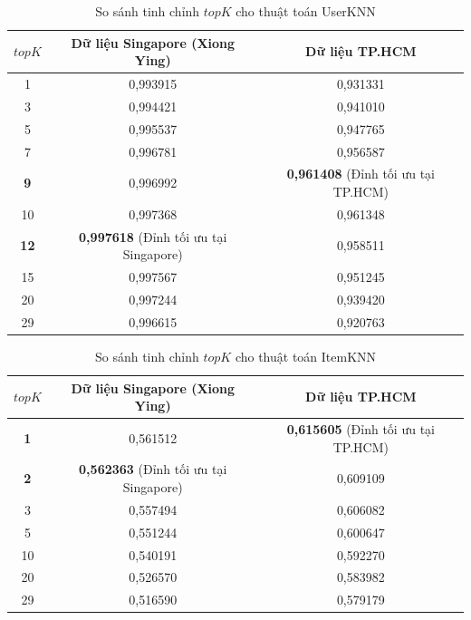 \documentclass[journal,onecolumn,10pt]{IEEEtran}
\begin{document}
\begin{table}[H]
\centering
\caption{So sánh tinh chỉnh $topK$ cho thuật toán UserKNN}
\label{tab:topk_user}
\small
\setlength{\tabcolsep}{8pt}
\begin{tabular}{ccc}
\toprule
$topK$ & Dữ liệu Singapore (Xiong Ying) & Dữ liệu TP.HCM \\
\midrule
1  & 0,993915 & 0,931331 \\
3  & 0,994421 & 0,941010 \\
5  & 0,995537 & 0,947765 \\
7  & 0,996781 & 0,956587 \\
\textbf{9}  & 0,996992 & \textbf{0,961408} (Đỉnh tối ưu tại TP.HCM) \\
10 & 0,997368 & 0,961348 \\
\textbf{12} & \textbf{0,997618} (Đỉnh tối ưu tại Singapore) & 0,958511 \\
15 & 0,997567 & 0,951245 \\
20 & 0,997244 & 0,939420 \\
29 & 0,996615 & 0,920763 \\
\bottomrule
\end{tabular}
\end{table}

\begin{table}[H]
\centering
\caption{So sánh tinh chỉnh $topK$ cho thuật toán ItemKNN}
\label{tab:topk_item}
\small
\setlength{\tabcolsep}{8pt}
\begin{tabular}{ccc}
\toprule
$topK$ & Dữ liệu Singapore (Xiong Ying) & Dữ liệu TP.HCM \\
\midrule
\textbf{1}  & 0,561512 & \textbf{0,615605} (Đỉnh tối ưu tại TP.HCM) \\
\textbf{2}  & \textbf{0,562363} (Đỉnh tối ưu tại Singapore) & 0,609109 \\
3  & 0,557494 & 0,606082 \\
5  & 0,551244 & 0,600647 \\
10 & 0,540191 & 0,592270 \\
20 & 0,526570 & 0,583982 \\
29 & 0,516590 & 0,579179 \\
\bottomrule
\end{tabular}
\end{table}
\end{document}
